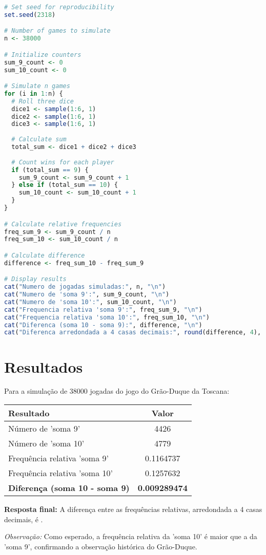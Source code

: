 \documentclass[11pt,a4paper]{article}
\begin{document}
\begin{lstlisting}[language=R]
# Set seed for reproducibility
set.seed(2318)

# Number of games to simulate
n <- 38000

# Initialize counters
sum_9_count <- 0
sum_10_count <- 0

# Simulate n games
for (i in 1:n) {
  # Roll three dice
  dice1 <- sample(1:6, 1)
  dice2 <- sample(1:6, 1)
  dice3 <- sample(1:6, 1)
  
  # Calculate sum
  total_sum <- dice1 + dice2 + dice3
  
  # Count wins for each player
  if (total_sum == 9) {
    sum_9_count <- sum_9_count + 1
  } else if (total_sum == 10) {
    sum_10_count <- sum_10_count + 1
  }
}

# Calculate relative frequencies
freq_sum_9 <- sum_9_count / n
freq_sum_10 <- sum_10_count / n

# Calculate difference
difference <- freq_sum_10 - freq_sum_9

# Display results
cat("Numero de jogadas simuladas:", n, "\n")
cat("Numero de 'soma 9':", sum_9_count, "\n")
cat("Numero de 'soma 10':", sum_10_count, "\n")
cat("Frequencia relativa 'soma 9':", freq_sum_9, "\n")
cat("Frequencia relativa 'soma 10':", freq_sum_10, "\n")
cat("Diferenca (soma 10 - soma 9):", difference, "\n")
cat("Diferenca arredondada a 4 casas decimais:", round(difference, 4), "\n")
\end{lstlisting}

\section*{Resultados}

\begin{tcolorbox}[colback=green!5!white,colframe=green!75!black,title=Solução]
Para a simulação de 38000 jogadas do jogo do Grão-Duque da Toscana:

\begin{center}
\begin{tabular}{|l|c|}
\hline
\textbf{Resultado} & \textbf{Valor} \\
\hline
Número de 'soma 9' & 4426 \\
Número de 'soma 10' & 4779 \\
\hline
Frequência relativa 'soma 9' & 0.1164737 \\
Frequência relativa 'soma 10' & 0.1257632 \\
\hline
\textbf{Diferença (soma 10 - soma 9)} & \textbf{0.009289474} \\
\hline
\end{tabular}
\end{center}

\vspace{0.5cm}
\textbf{Resposta final:} A diferença entre as frequências relativas, arredondada a 4 casas decimais, é .

\vspace{0.3cm}
\textit{Observação:} Como esperado, a frequência relativa da 'soma 10' é maior que a da 'soma 9', confirmando a observação histórica do Grão-Duque.
\end{tcolorbox}
\end{document}
